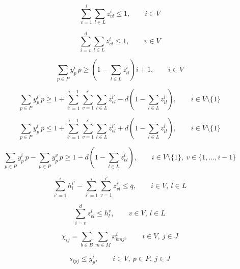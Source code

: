\documentclass[10pt,a4paper]{article}
\begin{document}
\begin{equation}
\sum_{v=1}^{i} \sum_{l \in L} z_{vl}^i \le 1,
\qquad i \in V
\tag{12}
\end{equation}

\begin{equation}
\sum_{i=v}^{d} \sum_{l \in L} z_{vl}^i \le 1,
\qquad v \in V
\tag{13}
\end{equation}

\begin{equation}
\sum_{p \in P} y_p^i \, p
\ge
\left(1-\sum_{l \in L} z_{il}^i\right) i + 1,
\qquad i \in V
\tag{14}
\end{equation}

\begin{equation}
\sum_{p \in P} y_p^i \, p
\ge
1 + \sum_{i'=1}^{i-1} \sum_{v=1}^{i'} \sum_{l \in L} z_{vl}^{i'}
- d\left(1-\sum_{l \in L} z_{il}^i\right),
\qquad i \in V \setminus \{1\}
\tag{15}
\end{equation}

\begin{equation}
\sum_{p \in P} y_p^i \, p
\le
1 + \sum_{i'=1}^{i-1} \sum_{v=1}^{i'} \sum_{l \in L} z_{vl}^{i'}
+ d\left(1-\sum_{l \in L} z_{il}^i\right),
\qquad i \in V \setminus \{1\}
\tag{16}
\end{equation}

\begin{equation}
\sum_{p \in P} y_p^i \, p
- \sum_{p \in P} y_p^v \, p
\ge
1 - d\left(1-\sum_{l \in L} z_{vl}^i\right),
\qquad i \in V \setminus \{1\},\ v \in \{1,\ldots,i-1\}
\tag{17}
\end{equation}

\begin{equation}
\sum_{i'=1}^{i} h_l^{i'}
- \sum_{i'=1}^{i} \sum_{v=1}^{i'} z_{vl}^{i'}
\le \bar{q},
\qquad i \in V,\ l \in L
\tag{18}
\end{equation}

\begin{equation}
\sum_{i=v}^{d} z_{vl}^i \le h_l^v,
\qquad v \in V,\ l \in L
\tag{19}
\end{equation}

\begin{equation}
\chi_{ij} = \sum_{b \in B} \sum_{m \in M} x_{bmj}^i,
\qquad i \in V,\ j \in J
\tag{20a}
\end{equation}

\begin{equation}
s_{ipj} \le y_p^i,
\qquad i \in V,\ p \in P,\ j \in J
\tag{20b}
\end{equation}
\end{document}
